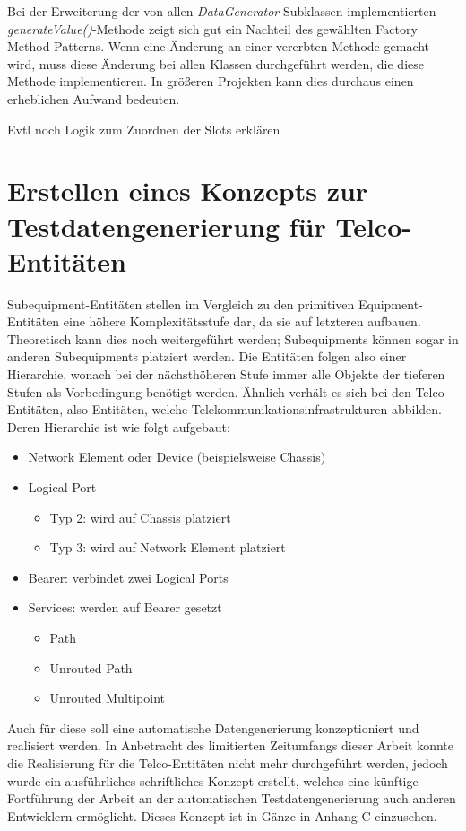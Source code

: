 Bei der Erweiterung der von allen \textit{DataGenerator}-Subklassen implementierten \textit{generateValue()}-Methode zeigt sich gut ein Nachteil des gewählten Factory Method Patterns. Wenn eine Änderung an einer vererbten Methode gemacht wird, muss diese Änderung bei allen Klassen durchgeführt werden, die diese Methode implementieren. In größeren Projekten kann dies durchaus einen erheblichen Aufwand bedeuten. 

Evtl noch Logik zum Zuordnen der Slots erklären

\section{Erstellen eines Konzepts zur Testdatengenerierung für Telco-Entitäten}\label{sec:tdgtelco}
Subequipment-Entitäten stellen im Vergleich zu den primitiven Equipment-Entitäten eine höhere Komplexitätsstufe dar, da sie auf letzteren aufbauen. Theoretisch kann dies noch weitergeführt werden; Subequipments können sogar in anderen Subequipments platziert werden. Die Entitäten folgen also einer Hierarchie, wonach bei der nächsthöheren Stufe immer alle Objekte der tieferen Stufen als Vorbedingung benötigt werden. Ähnlich verhält es sich bei den Telco-Entitäten, also Entitäten, welche Telekommunikationsinfrastrukturen abbilden. Deren Hierarchie ist wie folgt aufgebaut:

\begin{itemize}
    \item Network Element oder Device (beispielsweise Chassis)
    \item Logical Port
    \begin{itemize}
        \item Typ 2: wird auf Chassis platziert
        \item Typ 3: wird auf Network Element platziert
    \end{itemize}
    \item Bearer: verbindet zwei Logical Ports
    \item Services: werden auf Bearer gesetzt
    \begin{itemize}
        \item Path
        \item Unrouted Path
        \item Unrouted Multipoint
    \end{itemize}
\end{itemize}

Auch für diese soll eine automatische Datengenerierung konzeptioniert und realisiert werden. In Anbetracht des limitierten Zeitumfangs dieser Arbeit konnte die Realisierung für die Telco-Entitäten nicht mehr durchgeführt werden, jedoch wurde ein ausführliches schriftliches Konzept erstellt, welches eine künftige Fortführung der Arbeit an der automatischen Testdatengenerierung auch anderen Entwicklern ermöglicht. Dieses Konzept ist in Gänze in Anhang C einzusehen.